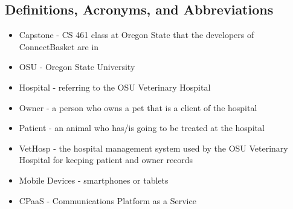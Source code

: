 \documentclass[onecolumn, draftclsnofoot,10pt, compsoc]{IEEEtran}
\begin{document}
\subsection{Definitions, Acronyms, and Abbreviations}
\begin{itemize}
\item Capstone - CS 461 class at Oregon State that the developers of ConnectBasket are in
 
\item OSU - Oregon State University

\item Hospital - referring to the OSU Veterinary Hospital

\item Owner - a person who owns a pet that is a client of the hospital

\item Patient - an animal who has/is going to be treated at the hospital 

\item VetHosp - the hospital management system used by the OSU Veterinary Hospital for keeping patient and owner records

\item Mobile Devices - smartphones or tablets

\item CPaaS  - Communications Platform as a Service
\end{itemize}
\end{document}
